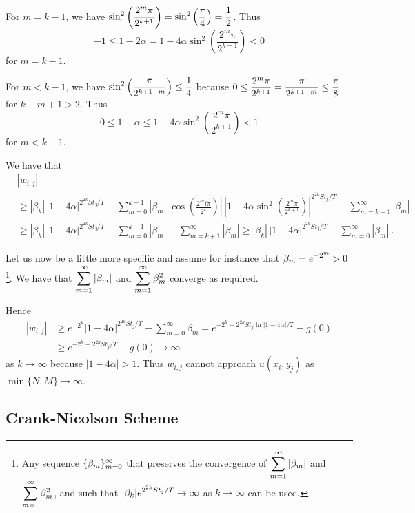 \begin{egg}
For $m = k - 1$, we have
$\displaystyle \sin^2\left(\frac{2^m\pi}{2^{k+1}} \right)
= \sin^2\left(\frac{\pi}{4}\right) = \frac{1}{2}$.  Thus
\[
  -1 \leq 1 - 2\alpha = 1 - 4\alpha \sin^2\left(\frac{2^m\pi}{2^{k+1}}
  \right) <  0
\]
for $m = k -1$.

For $m < k - 1$, we have
$\displaystyle \sin^2\left(\frac{\pi}{2^{k+1-m}} \right) \leq \frac{1}{4}$
because
$\displaystyle 0 \leq \frac{2^m\pi}{2^{k+1}} = \frac{\pi}{2^{k+1-m}}
\leq \frac{\pi}{8}$
for $k-m +1 > 2$.  Thus
\[
  0 \leq 1 - \alpha \leq 1 - 4\alpha \sin^2\left(\frac{2^m\pi}{2^{k+1}}
  \right) <  1
\]
for $m < k-1$.

We have that
\begin{align*}
&\left|w_{i,j}\right|\\
& \geq |\beta_k|\, \left|1 - 4\alpha \right|^{2^{2k} S t_j/T}
- \sum_{m=0}^{k-1} |\beta_m|
\left| \cos\left( \frac{ 2^m i \pi}{2^k}\right) \right|
\, \left|1 - 4\alpha \sin^2\left( \frac{2^m\pi}{2^{k+1}} \right)
\right|^{2^{2k} S t_j/T}
- \sum_{m=k+1}^\infty |\beta_m| \\
& \geq |\beta_k|\, \left|1 - 4\alpha \right|^{2^{2k} S t_j/T}
- \sum_{m=0}^{k-1} |\beta_m| - \sum_{m=k+1}^\infty |\beta_m|
\geq |\beta_k|\, \left|1 - 4\alpha \right|^{2^{2k} S t_j/T}
- \sum_{m=0}^\infty |\beta_m| \ .
\end{align*}

Let us now be a little more specific and assume for instance that
$\displaystyle \beta_m = e^{-2^m} >0$ \footnote{Any sequence
$\displaystyle \{\beta_m\}_{m=0}^\infty$ that preserves the convergence of
$\displaystyle \sum_{m=1}^\infty|\beta_m|$ and
$\displaystyle \sum_{m=1}^\infty\beta_m^2$, and such that
$\displaystyle |\beta_k| e^{2^{2k} S t_j/T} \to \infty$ as $k \to
\infty$ can be used.}.  We have that
$\displaystyle \sum_{m=1}^\infty|\beta_m|$ and
$\displaystyle \sum_{m=1}^\infty\beta_m^2$ converge as required.

Hence
\begin{align*}
\left|w_{i,j}\right|
&\geq  e^{-2^k} \left|1 - 4\alpha \right|^{2^{2k} S t_j/T}
- \sum_{m=0}^\infty \beta_m
= e^{-2^k + 2^{2k} S t_j \ln|1-4\alpha|/T} - g(0) \\
&\geq e^{-2^k + 2^{2k} S t_j/T} - g(0) 
\to \infty
\end{align*}
as $k\to \infty$ because $|1 - 4\alpha|>1$.  Thus $w_{i,j}$ cannot
approach $u(x_i,y_j)$ as $\min \{N,M\} \to \infty$.
\end{egg}

\subsection{Crank-Nicolson Scheme}

